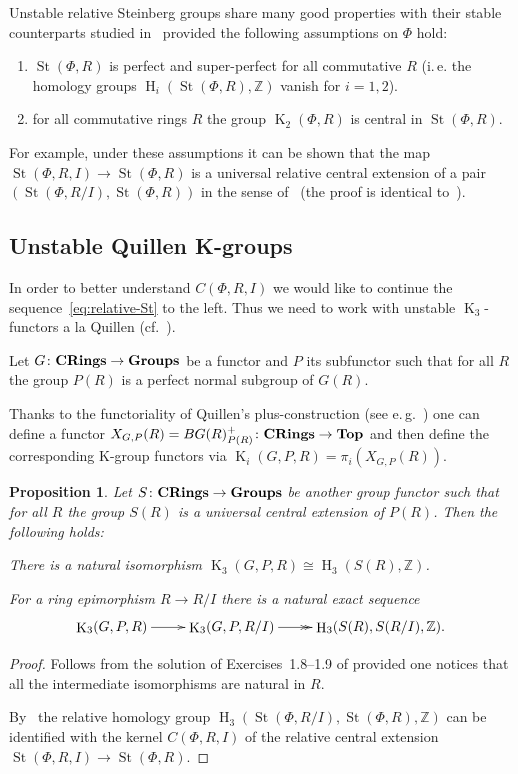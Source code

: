\documentclass[oneside, 10pt]{amsart}
\newtheorem{prop}{Proposition}
\theoremstyle{remark}
\theoremstyle{definition}
\DeclareMathOperator{\St}{St}
\DeclareMathOperator{\HH}{H}
\DeclareMathOperator{\K}{K}
\newcommand{\catname}[1]{{\normalfont\textbf{#1}}} %
\newcommand{\ZZ}{\mathbb{Z}}
\numberwithin{equation}{section}
\begin{document}
Unstable relative Steinberg groups share many good properties with their stable counterparts studied in~\cite{Lo78} provided the following assumptions on $\Phi$ hold: \begin{enumerate}
 \item $\St(\Phi, R)$ is perfect and super-perfect for all commutative $R$ (i.\,e. the homology groups $\HH_i(\St(\Phi, R), \ZZ)$ vanish for $i=1,2$).
 \item for all commutative rings $R$ the group $\K_2(\Phi, R)$ is central in $\St(\Phi, R)$.
\end{enumerate}
For example, under these assumptions it can be shown that the map $\St(\Phi, R, I) \to \St(\Phi, R)$ is a universal relative central extension of a pair $(\St(\Phi, R/I), \St(\Phi, R))$ in the sense of~\cite{Lo78} (the proof is identical to~\cite[Corollary~3]{S15}).

\subsection{Unstable Quillen K-groups}
In order to better understand $C(\Phi, R, I)$  we would like to continue the sequence~\eqref{eq:relative-St} to the left. 
Thus we need to work with unstable $\K_3$-functors a la Quillen (cf.~\cite{Pa89}).

Let $G \colon \catname{CRings} \to \catname{Groups}$ be a functor and $P$ its subfunctor such that for all $R$ the group $P(R)$ is a perfect normal subgroup of $G(R)$.

Thanks to the functoriality of Quillen's plus-construction (see e.\,g.~\cite[Proposition~5.2.4]{Ro95}) one can define a functor 
$X_{G, P}(R) = BG(R)^+_{P(R)} \colon \catname{CRings} \to \catname{Top}$ and then define the corresponding K-group functors via $\K_{i}(G, P, R) = \pi_i(X_{G, P}(R))$.

\begin{prop}\label{characterization}
Let $S \colon \catname{CRings} \to \catname{Groups}$ be another group functor such that
 for all $R$ the group $S(R)$ is a universal central extension of $P(R)$. Then the following holds:
\begin{proplist}
 \item There is a natural isomorphism $\K_3(G, P, R) \cong \HH_3(S(R), \ZZ)$.
 \item For a ring epimorphism $R \to R/I$ there is a natural exact sequence
 \[ \xymatrix{\K_3(G, P, R) \ar[r] & \K_3(G, P, R/I) \ar@{->>}[r] & \HH_3(S(R), S(R/I), \ZZ).} \]
\end{proplist}
\end{prop}
\begin{proof}
 Follows from the solution of Exercises~1.8--1.9 of \cite[Chapter~IV]{Kbook} provided one notices that all the intermediate isomorphisms are natural in $R$.
 
 By~\cite[Th{\'e}or{\`e}me~2]{Lo78} the relative homology group $\HH_3(\St(\Phi, R/I), \St(\Phi, R), \ZZ)$ can be identified with the kernel $C(\Phi, R, I)$ of the relative central extension $\St(\Phi, R, I) \to \St(\Phi, R)$.
\end{proof}
\end{document}
